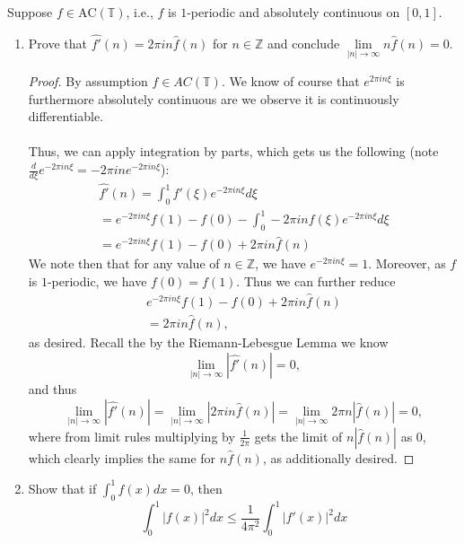 \documentclass[12pt]{article}
\newenvironment{ex}[2][Exercise]{\begin{trivlist}
\item[\hskip \labelsep {\bfseries #1}\hskip \labelsep {\bfseries #2.}]}{\end{trivlist}}
\begin{document}
\begin{ex}{6}
    Suppose $f \in \text{AC}(\mathbb{T})$, i.e., $f$ is $1$-periodic and absolutely continuous on $[0,1]$.
    \begin{enumerate}[label=6.\arabic*]
        \item Prove that $\hat{f'}(n) = 2\pi in\hat{f}(n)$ for $n \in \mathbb{Z}$ and conclude $\underset{|n| \rightarrow \infty}{\lim} n\hat{f}(n) = 0$.
        \begin{proof}
            By assumption $f \in AC(\mathbb{T})$. We know of course that $e^{2\pi in\xi}$ is furthermore absolutely continuous are we observe it is continuously differentiable. \\ \\
            Thus, we can apply integration by parts, which gets us the following (note $\frac{d}{d\xi} e^{-2\pi in\xi} = -2\pi ine^{-2\pi in\xi}$):
            \begin{align*}
                \hat{f'}(n) = \int_0^1 f'(\xi) e^{-2\pi i n\xi} d\xi \\
                = e^{-2\pi in\xi}f(1) - f(0) - \int_0^1 -2\pi in f(\xi)e^{-2\pi in \xi} d\xi \\
                = e^{-2\pi in\xi}f(1) - f(0) + 2\pi i n \hat{f}(n)
            \end{align*}
            We note then that for any value of $n \in \mathbb{Z}$, we have $e^{-2\pi in\xi} = 1$. Moreover, as $f$ is $1$-periodic, we have $f(0) = f(1)$. Thus we can further reduce 
            \begin{align*}
                e^{-2\pi in\xi}f(1) - f(0) + 2\pi i n \hat{f}(n) \\
                = 2\pi in\hat{f}(n),
            \end{align*}
            as desired. Recall the by the Riemann-Lebesgue Lemma we know 
            $$\underset{|n| \rightarrow \infty}{\lim} |\hat{f'}(n)| = 0,$$
            and thus 
            $$\underset{|n| \rightarrow \infty}{\lim} |\hat{f'}(n)| = \underset{|n| \rightarrow \infty}{\lim} |2\pi i n \hat{f}(n)| = \underset{|n| \rightarrow \infty}{\lim} 2\pi n |\hat{f}(n)| = 0,$$
            where from limit rules multiplying by $\frac{1}{2\pi}$ gets the limit of $n|\hat{f}(n)|$ as $0$, which clearly implies the same for $n\hat{f}(n)$, as additionally desired.
        \end{proof}
        \item Show that if $\int_0^1 f(x) dx = 0$, then 
        $$\int_0^1 |f(x)|^2 dx \leq \frac{1}{4\pi^2} \int_0^1 |f'(x)|^2 dx$$
    \end{enumerate}
\end{ex}
\end{document}

